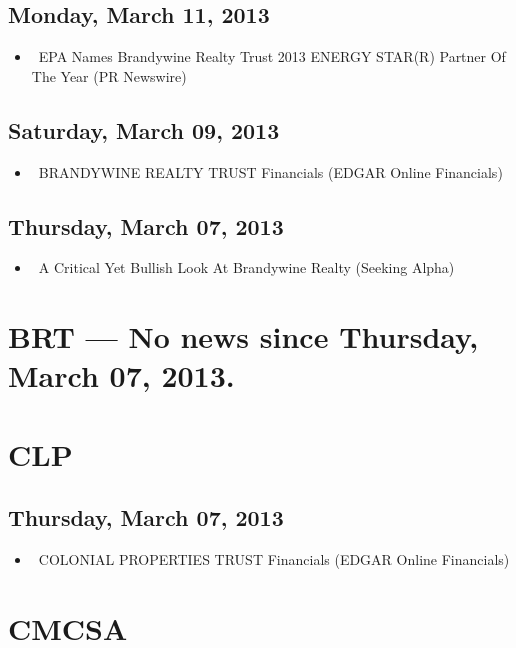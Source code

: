 \documentclass[11pt,asymmetric]{article}
\begin{document}
\subsection*{Monday, March 11, 2013}
\begin{itemize}
\item\ EPA Names Brandywine Realty Trust 2013 ENERGY STAR(R) Partner Of The Year (PR Newswire)
\end{itemize}
\subsection*{Saturday, March 09, 2013}
\begin{itemize}
\item\ BRANDYWINE REALTY TRUST Financials (EDGAR Online Financials)
\end{itemize}
\subsection*{Thursday, March 07, 2013}
\begin{itemize}
\item\ A Critical Yet Bullish Look At Brandywine Realty (Seeking Alpha)
\end{itemize}

\section*{BRT --- No news since Thursday, March 07, 2013.}


\section*{CLP}

\subsection*{Thursday, March 07, 2013}
\begin{itemize}
\item\ COLONIAL PROPERTIES TRUST Financials (EDGAR Online Financials)
\end{itemize}

\section*{CMCSA}
\end{document}
